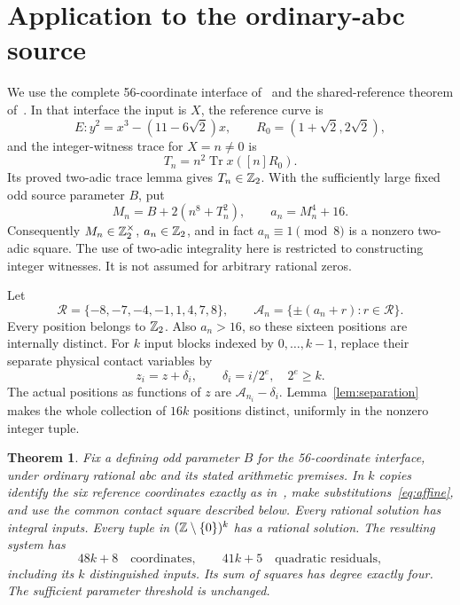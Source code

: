 \documentclass[11pt]{article}
\newtheorem{theorem}{Theorem}
\begin{document}
\section{Application to the ordinary-abc source}

We use the complete 56-coordinate interface of~\cite{abc56} and the
shared-reference theorem of~\cite{reference}. In that interface the
input is \(X\), the reference curve is
\[
 E:y^2=x^3-(11-6\sqrt2)x,\qquad
 R_0=(1+\sqrt2,2\sqrt2),
\]
and the integer-witness trace for \(X=n\ne0\) is
\[
 T_n=n^2\operatorname{Tr}x([n]R_0).
\]
Its proved two-adic trace lemma gives \(T_n\in\mathbb Z_2\). With the
sufficiently large fixed odd source parameter \(B\), put
\[
 M_n=B+2(n^8+T_n^2),\qquad a_n=M_n^4+16.
\]
Consequently \(M_n\in\mathbb Z_2^\times\), \(a_n\in\mathbb Z_2\), and in fact
\(a_n\equiv1\pmod8\) is a nonzero two-adic square. The use of
two-adic integrality here is restricted to constructing integer
witnesses. It is not assumed for arbitrary rational zeros.

Let
\[
 \mathcal R=\{-8,-7,-4,-1,1,4,7,8\},\qquad
 \mathcal A_n=\{\pm(a_n+r):r\in\mathcal R\}.
\]
Every position belongs to \(\mathbb Z_2\). Also \(a_n>16\), so these sixteen
positions are internally distinct. For \(k\) input blocks indexed by
\(0,\ldots,k-1\), replace their separate physical contact variables by
\begin{equation}\label{eq:affine}
                   z_i=z+\delta_i,
 \qquad\delta_i=i/2^e,\quad 2^e\ge k.
\end{equation}
The actual positions as functions of \(z\) are
\(\mathcal A_{n_i}-\delta_i\). Lemma~\ref{lem:separation} makes the
whole collection of \(16k\) positions distinct, uniformly in the
nonzero integer tuple.

\begin{theorem}\label{thm:tuple}
Fix a defining odd parameter \(B\) for the 56-coordinate interface,
under ordinary rational abc and its stated arithmetic premises.
In \(k\) copies identify the six reference coordinates exactly as
in~\cite{reference}, make substitutions~\eqref{eq:affine}, and use the
common contact square described below.
Every rational solution has integral inputs. Every tuple in
\((\mathbb Z\setminus\{0\})^k\) has a rational solution.
The resulting system has
\[
                   48k+8\quad\text{coordinates},\qquad
                   41k+5\quad\text{quadratic residuals},
\]
including its \(k\) distinguished inputs. Its sum of squares has degree
exactly four. The sufficient parameter threshold is unchanged.
\end{theorem}
\end{document}
